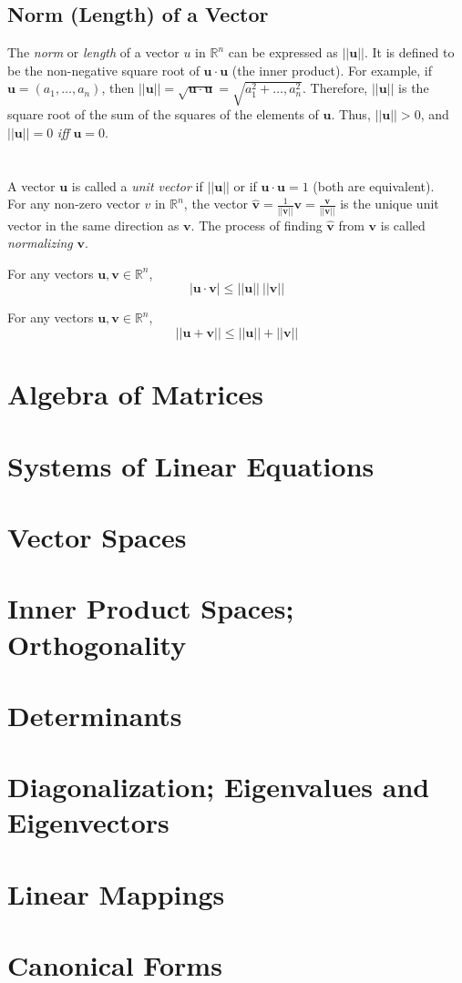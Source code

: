 \documentclass[../setup.tex]{subfiles}
\begin{document}
\subsection{Norm (Length) of a Vector}
The \textit{norm} or \textit{length} of a vector $u$ in $\mathbb{R}^n$ can be expressed as $||\bm{u}||$. It is defined to be the non-negative square root of $\bm{u} \cdot \bm{u}$ (the inner product). For example, if $\bm{u} = (a_1, \dots, a_n)$, then $||\bm{u}|| = \sqrt{\bm{u} \cdot \bm{u}} = \sqrt{a_1^2 + \dots, a_n^2}$. Therefore, $||\bm{u}||$ is the square root of the sum of the squares of the elements of $\bm{u}$. Thus, $||\bm{u}|| > 0$, and $||\bm{u}|| = 0$ \textit{iff} $\bm{u} = 0$. \\
\phantom \\ \\
A vector $\bm{u}$ is called a \textit{unit vector} if $||\bm{u}||$ or if $\bm{u} \cdot \bm{u} = 1$ (both are equivalent). \\
For any non-zero vector $v$ in $\mathbb{R}^n$, the vector $\hat{\bm{v}} = \frac{1}{||\bm{v}||}\bm{v} = \frac{\bm{v}}{||\bm{v}||}$ is the unique unit vector in the same direction as $\bm{v}$. The process of finding $\hat{\bm{v}}$ from $\bm{v}$ is called \textit{normalizing} $\bm{v}$. \\
\begin{theorem}
For any vectors $\bm{u}, \bm{v} \in \mathbb{R}^n$, 
\[|\bm{u} \cdot \bm{v}| \leq ||\bm{u}|| \ ||\bm{v}||\]
\end{theorem}
\begin{theorem}
For any vectors $\bm{u}, \bm{v} \in \mathbb{R}^n$,
\[||\bm{u} + \bm{v}|| \leq ||\bm{u}|| + ||\bm{v}||\]
\end{theorem}

\section{Algebra of Matrices}
\section{Systems of Linear Equations}
\section{Vector Spaces}
\section{Inner Product Spaces; Orthogonality}
\section{Determinants}
\section{Diagonalization; Eigenvalues and Eigenvectors}
\section{Linear Mappings}
\section{Canonical Forms}
\end{document}
